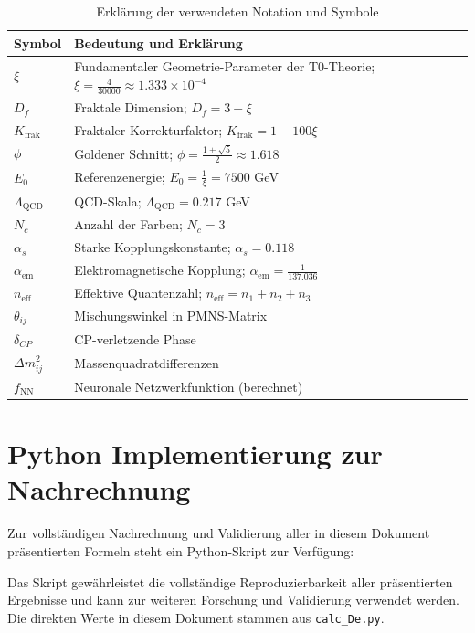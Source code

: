 	\begin{table}[h]
		\centering
		\begin{tabular}{p{2cm}p{12cm}}
			\toprule
			\textbf{Symbol} & \textbf{Bedeutung und Erklärung} \\
			\midrule
			$\xi$ & Fundamentaler Geometrie-Parameter der T0-Theorie; $\xi = \frac{4}{30000} \approx 1.333 \times 10^{-4}$ \\
			$D_f$ & Fraktale Dimension; $D_f = 3 - \xi$ \\
			$K_{\text{frak}}$ & Fraktaler Korrekturfaktor; $K_{\text{frak}} = 1 - 100\xi$ \\
			$\phi$ & Goldener Schnitt; $\phi = \frac{1 + \sqrt{5}}{2} \approx 1.618$ \\
			$E_0$ & Referenzenergie; $E_0 = \frac{1}{\xi} = 7500$ GeV \\
			$\Lambda_{\text{QCD}}$ & QCD-Skala; $\Lambda_{\text{QCD}} = 0.217$ GeV \\
			$N_c$ & Anzahl der Farben; $N_c = 3$ \\
			$\alpha_s$ & Starke Kopplungskonstante; $\alpha_s = 0.118$ \\
			$\alpha_{\text{em}}$ & Elektromagnetische Kopplung; $\alpha_{\text{em}} = \frac{1}{137.036}$ \\
			$n_{\text{eff}}$ & Effektive Quantenzahl; $n_{\text{eff}} = n_1 + n_2 + n_3$ \\
			$\theta_{ij}$ & Mischungswinkel in PMNS-Matrix \\
			$\delta_{CP}$ & CP-verletzende Phase \\
			$\Delta m^2_{ij}$ & Massenquadratdifferenzen \\
			$f_{\text{NN}}$ & Neuronale Netzwerkfunktion (berechnet) \\
			\bottomrule
		\end{tabular}
		\caption{Erklärung der verwendeten Notation und Symbole}
		\label{tab:symbole}
	\end{table}
	\section{Python Implementierung zur Nachrechnung}
	\label{app:python_nachrechnung}
	
	Zur vollständigen Nachrechnung und Validierung aller in diesem Dokument präsentierten Formeln steht ein Python-Skript zur Verfügung:

	Das Skript gewährleistet die vollständige Reproduzierbarkeit aller präsentierten Ergebnisse und kann zur weiteren Forschung und Validierung verwendet werden. Die direkten Werte in diesem Dokument stammen aus \texttt{calc\_De.py}.
	
